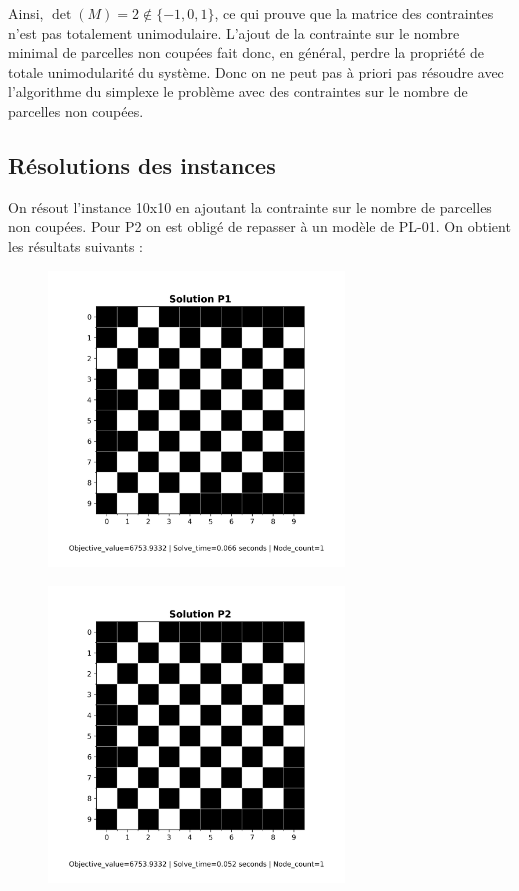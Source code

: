 \documentclass[a4paper,11pt]{article}
\begin{document}
\vspace{0.3cm}
\noindent
Ainsi, $\det(M) = 2 \notin \{-1,0,1\}$, ce qui prouve que la matrice des contraintes n’est pas totalement unimodulaire.
L’ajout de la contrainte sur le nombre minimal de parcelles non coupées fait donc, en général, perdre la propriété de totale unimodularité du système.
Donc on ne peut pas à priori pas résoudre avec l'algorithme du simplexe le problème avec des contraintes sur le nombre de parcelles non coupées.
\subsection{Résolutions des instances}
On résout l'instance 10x10 en ajoutant la contrainte sur le nombre de parcelles non coupées. Pour P2 on est obligé de repasser à un modèle de PL-01. 
On obtient les résultats suivants :
\begin{figure}[H]
  \centering
  \includegraphics[width=0.7\textwidth]{figs/P1_solution_instance1_B.png}
\end{figure}
\begin{figure}[H]
  \centering
  \includegraphics[width=0.7\textwidth]{figs/P2_solution_instance1_B.png}
\end{figure}
\end{document}
